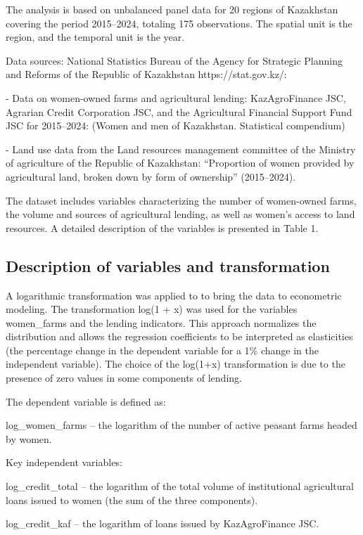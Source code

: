 ﻿\documentclass[sn-mathphys-num]{sn-jnl}
\begin{document}
The analysis is based on unbalanced panel data for 20 regions of
Kazakhstan covering the period 2015--2024, totaling 175 observations.
The spatial unit is the region, and the temporal unit is the year.

Data sources: National Statistics Bureau of the Agency for Strategic
Planning and Reforms of the Republic of Kazakhstan https://stat.gov.kz/:

- Data on women-owned farms and agricultural lending: KazAgroFinance
JSC, Agrarian Credit Corporation JSC, and the Agricultural Financial
Support Fund JSC for 2015--2024: (Women and men of Kazakhstan.
Statistical compendium)

- Land use data from the Land resources management committee of the
Ministry of agriculture of the Republic of Kazakhstan: ``Proportion of
women provided by agricultural land, broken down by form of ownership''
(2015--2024).

The dataset includes variables characterizing the number of women-owned
farms, the volume and sources of agricultural lending, as well as
women's access to land resources. A detailed description of the
variables is presented in Table 1.

\subsection{Description of variables and transformation}

A logarithmic transformation was applied to to bring the data to
econometric modeling. The transformation log(1 + x) was used for the
variables women\_farms and the lending indicators. This approach
normalizes the distribution and allows the regression coefficients to be
interpreted as elasticities (the percentage change in the dependent
variable for a 1\% change in the independent variable). The choice of
the log(1+x) transformation is due to the presence of zero values in
some components of lending.

The dependent variable is defined as:

log\_women\_farms -- the logarithm of the number of active peasant farms
headed by women.

Key independent variables:

log\_credit\_total -- the logarithm of the total volume of institutional
agricultural loans issued to women (the sum of the three components).

log\_credit\_kaf -- the logarithm of loans issued by KazAgroFinance JSC.
\end{document}
